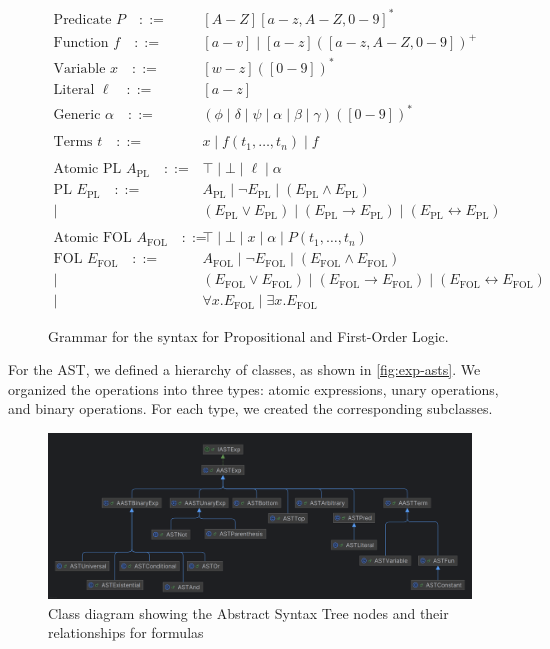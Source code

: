 \begin{figure}[h!]
\centering
{
\begin{align*}
\text{Predicate } P \quad ::= &\quad [A-Z][a-z,A-Z,0-9]^* \\
\text{Function } f \quad ::= &\quad [a-v] \mid [a-z]([a-z,A-Z,0-9])^+ \\
\text{Variable } x \quad ::= &\quad [w-z] ([0-9])^* \\
\text{Literal } \ell \quad ::= &\quad [a-z] \\
\text{Generic } \alpha \quad ::= &\quad (\phi \mid \delta \mid \psi \mid \alpha \mid \beta \mid \gamma)([0-9])^*\\
\\
\text{Terms } t \quad ::= &\quad x \mid f(t_1, \dots, t_n) \mid f \\
\\
\text{Atomic PL } A_\text{PL} \quad ::= &\quad \top \mid \bot \mid \ell \mid \alpha \\
\text{PL } E_\text{PL} \quad ::= &\quad A_\text{PL} \mid \lnot E_\text{PL} \mid (E_\text{PL} \wedge E_\text{PL}) \\
\mid &\quad (E_\text{PL} \vee E_\text{PL}) \mid (E_\text{PL} \to E_\text{PL}) \mid (E_\text{PL} \leftrightarrow E_\text{PL}) \\
\\
\text{Atomic FOL } A_\text{FOL} \quad ::= &\quad \top \mid \bot \mid x \mid \alpha \mid P(t_1, \dots, t_n) \\
\text{FOL } E_\text{FOL} \quad ::= &\quad A_\text{FOL} \mid  \lnot E_\text{FOL} \mid (E_\text{FOL} \wedge E_\text{FOL}) \\
\mid &\quad (E_\text{FOL} \vee E_\text{FOL}) \mid (E_\text{FOL} \to E_\text{FOL}) \mid (E_\text{FOL} \leftrightarrow E_\text{FOL}) \\
\mid &\quad \forall x. E_\text{FOL} \mid \exists x. E_\text{FOL}
\end{align*}
}
\caption{Grammar for the syntax for Propositional and First-Order Logic.}
\label{fig:formulas-syntax}
\end{figure}

For the \gls{AST}, we defined a hierarchy of classes, as shown in \autoref{fig:exp-asts}. We organized the operations into three types: atomic expressions, unary operations, and binary operations. For each type, we created the corresponding subclasses.

\begin{figure}
    \centering
    \includegraphics[width=0.95\linewidth]{Chapters/Figures/ast-exp.png}
    \caption{Class diagram showing the Abstract Syntax Tree nodes and their relationships for formulas}
    \label{fig:exp-asts}
\end{figure}

